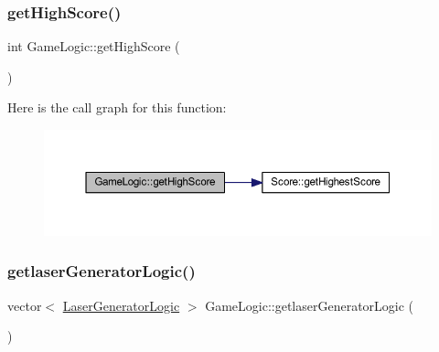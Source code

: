 \mbox{\label{class_game_logic_a05ad3bbd5acd9f0b41d1f1d29cac8017}} 
\subsubsection{\texorpdfstring{get\+High\+Score()}{getHighScore()}}
{\footnotesize\ttfamily int Game\+Logic\+::get\+High\+Score (\begin{DoxyParamCaption}{ }\end{DoxyParamCaption})}

Here is the call graph for this function\+:\nopagebreak
\begin{figure}[H]
\begin{center}
\leavevmode
\includegraphics[width=350pt]{class_game_logic_a05ad3bbd5acd9f0b41d1f1d29cac8017_cgraph}
\end{center}
\end{figure}
\mbox{\label{class_game_logic_abe0e031ff3278ebb3c049b06f458e5b4}} 
\subsubsection{\texorpdfstring{getlaser\+Generator\+Logic()}{getlaserGeneratorLogic()}}
{\footnotesize\ttfamily vector$<$ \hyperlink{class_laser_generator_logic}{Laser\+Generator\+Logic} $>$ Game\+Logic\+::getlaser\+Generator\+Logic (\begin{DoxyParamCaption}{ }\end{DoxyParamCaption})}

\mbox{\label{class_game_logic_a933e3cb807803f40baa6dd8dffedd000}} 
